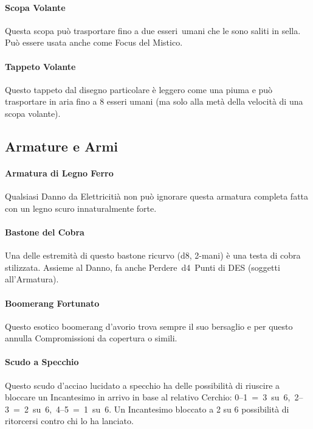 \documentclass[itdr]{subfiles}
\begin{document}
\vfill
\paragraph{Scopa Volante}
Questa scopa può trasportare fino a due \mbox{esseri umani} che le sono saliti in sella. Può essere usata anche come Focus del Mistico.

\vfill
\paragraph{Tappeto Volante}
Questo tappeto dal disegno particolare è leggero come una piuma e può trasportare in aria fino a 8 esseri umani (ma solo alla metà della velocità di una scopa volante).

\vfill
\break

\subsection*{Armature e Armi}

\paragraph{Armatura di Legno Ferro}
Qualsiasi Danno da Elettricitià non può ignorare questa \mbox{armatura} completa fatta con un legno scuro innaturalmente forte.

\paragraph{Bastone del Cobra}
Una delle estremità di questo bastone ricurvo (d8, 2-mani) è una testa di cobra stilizzata. Assieme al Danno, fa anche Perdere~d4~Punti di DES (soggetti all'Armatura).

\paragraph{Boomerang Fortunato}
Questo esotico boomerang d'avorio trova sempre il suo bersaglio e per questo annulla Compromissioni da copertura o simili.

\paragraph{Scudo a Specchio}
Questo scudo d'acciao lucidato a specchio ha delle possibilità di riuscire a bloccare un Incantesimo in arrivo in base al relativo Cerchio: \mbox{0--1 = 3 su 6, 2--3 = 2 su 6, 4--5 = 1 su 6}. Un Incantesimo bloccato a 2 su 6 possibilità di ritorcersi contro chi lo ha lanciato.
\end{document}

